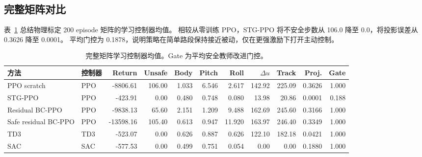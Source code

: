 \documentclass[UTF8,letterpaper,twocolumn]{ctexart}
\begin{document}
\begin{table}[t]
\centering
\caption{重复随机种子证据。Return 差值越高越好，其余差值越低越好。}
\label{tab:seed_zh}
\end{table}

\subsection{完整矩阵对比}

表~\ref{tab:full_zh} 总结物理标定 200 episode 矩阵的学习控制器均值。
相较从零训练 PPO，STG-PPO 将不安全步数从 106.0 降至 0.0，将投影误差从 0.3626 降至 0.0001。
平均门控为 0.1878，说明策略在简单路段保持接近被动，仅在更强激励下打开主动控制。

\begin{table}[t]
\centering
\caption{完整矩阵学习控制器均值。Gate 为平均安全教师改进门控。}
\label{tab:full_zh}
\begin{tabular}{llrrrrrrrrr}
\toprule
方法 & 控制器 & Return & Unsafe & Body & Pitch & Roll & $\Delta u$ & Track & Proj. & Gate \\
\midrule
PPO scratch & PPO & -8806.61 & 106.00 & 1.033 & 6.546 & 2.617 & 142.92 & 225.09 & 0.3626 & 1.000 \\
STG-PPO & PPO & -423.91 & 0.00 & 0.480 & 0.748 & 0.080 & 13.98 & 20.86 & 0.0001 & 0.188 \\
Residual BC-PPO & PPO & -9838.13 & 65.60 & 2.151 & 1.209 & 9.488 & 162.69 & 245.60 & 0.3166 & 1.000 \\
Safe residual BC-PPO & PPO & -13598.16 & 105.40 & 0.613 & 0.947 & 11.920 & 163.97 & 246.40 & 0.3349 & 1.000 \\
TD3 & TD3 & -523.07 & 0.00 & 0.626 & 0.887 & 0.626 & 122.10 & 182.18 & 0.0421 & 1.000 \\
SAC & SAC & -577.53 & 0.00 & 0.499 & 0.751 & 0.054 & 0.00 & 0.00 & 0.1880 & 1.000 \\
\bottomrule
\end{tabular}
\end{table}
\end{document}
